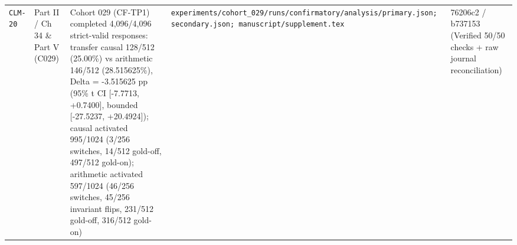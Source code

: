 {\begin{longtable}{@{}>{\raggedright\arraybackslash}p{1.2cm}>{\raggedright\arraybackslash}p{2.0cm}>{\raggedright\arraybackslash}p{4.8cm}>{\raggedright\arraybackslash}p{3.9cm}>{\raggedright\arraybackslash}p{2.5cm}@{}}
\texttt{CLM-\allowbreak{}20} & Part II /\allowbreak{} Ch 34 \& Part V (C029) & Cohort 029 (CF-\allowbreak{}TP1) completed 4,096/\allowbreak{}4,096 strict-\allowbreak{}valid responses: transfer causal 128/\allowbreak{}512 (25.00\%) vs arithmetic 146/\allowbreak{}512 (28.515625\%), Delta = -\allowbreak{}3.515625 pp (95\% t CI [-\allowbreak{}7.7713, +0.7400], bounded [-\allowbreak{}27.5237, +20.4924]); causal activated 995/\allowbreak{}1024 (3/\allowbreak{}256 switches, 14/\allowbreak{}512 gold-\allowbreak{}off, 497/\allowbreak{}512 gold-\allowbreak{}on); arithmetic activated 597/\allowbreak{}1024 (46/\allowbreak{}256 switches, 45/\allowbreak{}256 invariant flips, 231/\allowbreak{}512 gold-\allowbreak{}off, 316/\allowbreak{}512 gold-\allowbreak{}on) & \texttt{experiments/\allowbreak{}cohort\_029/\allowbreak{}runs/\allowbreak{}confirmatory/\allowbreak{}analysis/\allowbreak{}primary.json; secondary.json; manuscript/\allowbreak{}supplement.tex} & 76206c2 /\allowbreak{} b737153 (Verified 50/\allowbreak{}50 checks + raw journal reconciliation) \\[2pt]
\end{longtable}
}